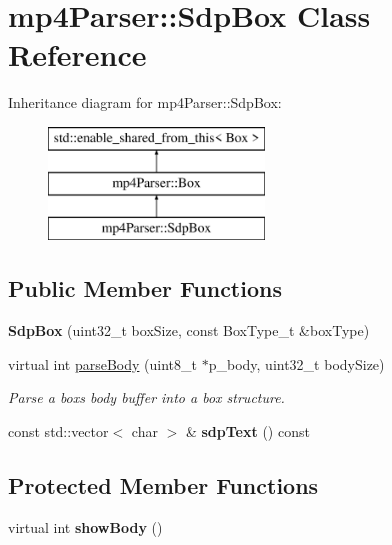 \hypertarget{classmp4_parser_1_1_sdp_box}{}\section{mp4\+Parser\+::Sdp\+Box Class Reference}
\label{classmp4_parser_1_1_sdp_box}
Inheritance diagram for mp4\+Parser\+::Sdp\+Box\+:\begin{figure}[H]
\begin{center}
\leavevmode
\includegraphics[height=3.000000cm]{classmp4_parser_1_1_sdp_box}
\end{center}
\end{figure}
\subsection*{Public Member Functions}
\begin{DoxyCompactItemize}
\item 
\mbox{\label{classmp4_parser_1_1_sdp_box_a47fd482adec12217b3bfd4283fe60ba1}} 
{\bfseries Sdp\+Box} (uint32\+\_\+t box\+Size, const Box\+Type\+\_\+t \&box\+Type)
\item 
virtual int \mbox{\hyperlink{classmp4_parser_1_1_sdp_box_a73c6c78702a8f6032bef5d6f1d703090}{parse\+Body}} (uint8\+\_\+t $\ast$p\+\_\+body, uint32\+\_\+t body\+Size)
\begin{DoxyCompactList}\small\item\em Parse a box\textquotesingle{}s body buffer into a box structure. \end{DoxyCompactList}\item 
\mbox{\label{classmp4_parser_1_1_sdp_box_aece0a710228a681bccd17a3909d18247}} 
const std\+::vector$<$ char $>$ \& {\bfseries sdp\+Text} () const
\end{DoxyCompactItemize}
\subsection*{Protected Member Functions}
\begin{DoxyCompactItemize}
\item 
\mbox{\label{classmp4_parser_1_1_sdp_box_aba31ff2e30ae1d4eb80c66975e198d11}} 
virtual int {\bfseries show\+Body} ()
\end{DoxyCompactItemize}
